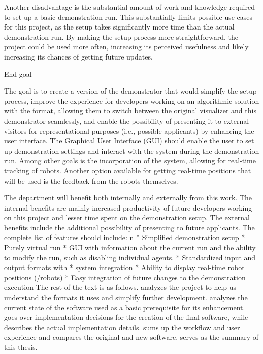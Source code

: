 Another disadvantage is the substantial amount of work and knowledge required to set up a basic demonstration run. This substantially limits possible use-cases for this project, as the setup takes significantly more time than the actual demonstration run. By making the setup process more straightforward, the project could be used more often, increasing its perceived usefulness and likely increasing its chances of getting future updates.

\sec End goal

The goal is to create a version of the demonstrator that would simplify the setup process, improve the experience for developers working on an algorithmic solution with the {\mapfIR} format, allowing them to switch between the original visualizer and this demonstrator seamlessly, and enable the possibility of presenting it to external visitors for representational purposes (i.e., possible applicants) by enhancing the user interface.\br
The Graphical User Interface (GUI) should enable the user to set up demonstration settings and interact with the system during the demonstration run.
Among other goals is the incorporation of the {\vicon} system, allowing for real-time tracking of robots. Another option available for getting real-time positions that will be used is the feedback from the robots themselves.\br
\br

The department will benefit both internally and externally from this work. The internal benefits are mainly increased productivity of future developers working on this project and lesser time spent on the demonstration setup. The external benefits include the additional possibility of presenting to future applicants.
The complete list of features should include:
\begitems \style n
    * Simplified demonstration setup
    * Purely virtual run
    * GUI with information about the current run and the ability to modify the run, such as disabling individual agents. 
    * Standardized input and output formats with \mapfIR
    * {\vicon} system integration
    * Ability to display real-time robot positions ({\vicon}/robots)
    * Easy integration of future changes to the demonstration execution
\enditems
\br
The rest of the text is as follows.
{} analyzes the {\mapfIR} project to help us understand the formats it uses and simplify further development. {} analyzes the current state of the software used as a basic prerequisite for its enhancement. {} goes over implementation decisions for the creation of the final software, while {} describes the actual implementation details. {} sums up the workflow and user experience and compares the original and new software. {} serves as the summary of this thesis.